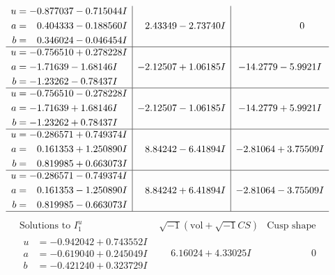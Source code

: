 \documentclass[1p]{elsarticle_modified}
\theoremstyle{definition}
\newcommand{\I}{\sqrt{-1}}
\begin{document}
$$\begin{array}{c|c|c}
\begin{aligned}
u &= -0.877037 - 0.715044 I \\
a &= \phantom{-}0.404333 - 0.188560 I \\
b &= \phantom{-}0.346024 - 0.046454 I\end{aligned}
 & \phantom{-}2.43349 - 2.73740 I & \phantom{-0.000000 } 0 \\ \hline\begin{aligned}
u &= -0.756510 + 0.278228 I \\
a &= -1.71639 - 1.68146 I \\
b &= -1.23262 - 0.78437 I\end{aligned}
 & -2.12507 + 1.06185 I & -14.2779 - 5.9921 I \\ \hline\begin{aligned}
u &= -0.756510 - 0.278228 I \\
a &= -1.71639 + 1.68146 I \\
b &= -1.23262 + 0.78437 I\end{aligned}
 & -2.12507 - 1.06185 I & -14.2779 + 5.9921 I \\ \hline\begin{aligned}
u &= -0.286571 + 0.749374 I \\
a &= \phantom{-}0.161353 + 1.250890 I \\
b &= \phantom{-}0.819985 + 0.663073 I\end{aligned}
 & \phantom{-}8.84242 - 6.41894 I & -2.81064 + 3.75509 I \\ \hline\begin{aligned}
u &= -0.286571 - 0.749374 I \\
a &= \phantom{-}0.161353 - 1.250890 I \\
b &= \phantom{-}0.819985 - 0.663073 I\end{aligned}
 & \phantom{-}8.84242 + 6.41894 I & -2.81064 - 3.75509 I\\
 \hline 
 \end{array}$$\newpage$$\begin{array}{c|c|c}  
\text{Solutions to }I^u_{1}& \I (\text{vol} + \sqrt{-1}CS) & \text{Cusp shape}\\
 \hline 
\begin{aligned}
u &= -0.942042 + 0.743552 I \\
a &= -0.619040 + 0.245049 I \\
b &= -0.421240 + 0.323729 I\end{aligned}
 & \phantom{-}6.16024 + 4.33025 I & \phantom{-0.000000 } 0 \\ \hline\begin{aligned}

\end{aligned}
\end{array}$$
\end{document}
